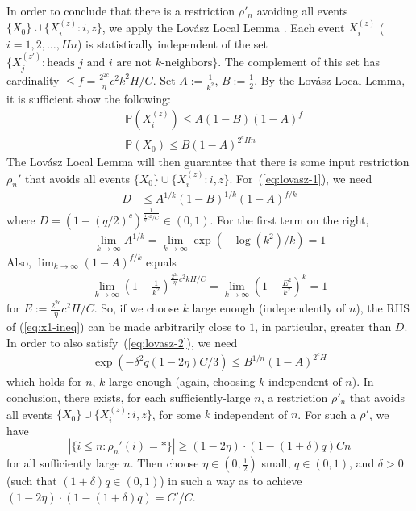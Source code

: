 \documentclass[11pt,a4paper]{article}
\newcommand{\Prob}{\mathbb{P}}%
\begin{document}
In order to conclude that there is a restriction $\rho'_n$ avoiding all events $\{X_0\} \cup \{X_i^{(z)} : i, z\}$, we apply the Lov{\'a}sz Local Lemma \cite[Theorem 6.17]{mitzenmacherprobability}.
Each event $X_i^{(z)}$ ($i=1,2,\dots, Hn$) is statistically independent of the set $\{X_j^{(z')} : \text{heads } j \text{ and } i \text{ are not $k$-neighbors}\}$.
The complement of this set has cardinality $\leq f= \frac{2^{2c}}{\eta}c^2k^2H/C$.
Set $A:=\frac{1}{k^2}$, $B:=\frac{1}{2}$.
By the Lov{\'a}sz Local Lemma, it is sufficient show the following: %
\begin{align}\label{eq:lovasz-1}
&\Prob(X_i^{(z)}) \leq A(1-B)(1-A)^{f} \\ \label{eq:lovasz-2}
&\Prob(X_0)  \leq B (1-A)^{2^cHn}
\end{align}
The Lov{\'a}sz Local Lemma will then guarantee that there is some input restriction $\rho_n'$ that avoids all events $\{X_0\} \cup \{X_i^{(z)} : i, z\}$.
For~(\ref{eq:lovasz-1}), we need
\begin{align}\label{eq:x1-ineq}
    D &\leq A^{1/k}(1-B)^{1/k}(1-A)^{f/k} 
\end{align}
where $D =  \left(1-(q/2)^c\right)^{\frac{1}{\frac{1}{\eta}c^2/C}} \in (0,1)$.
For the first term on the right, 
\begin{align*}
\lim_{k\rightarrow \infty} A^{1/k} = \lim_{k\rightarrow \infty} \exp\left(-\log(k^2) / k\right) = 1
\end{align*}
Also, $\lim_{k\rightarrow \infty} (1-A)^{f/k}$ equals
\begin{align*}
\lim_{k\rightarrow \infty} \left(1-\frac{1}{k^2}\right)^{\frac{2^{2c}}{\eta}c^2kH/C} = \lim_{k\rightarrow \infty} \left(1-\frac{E^2}{k^2}\right)^{k} = 1
\end{align*}
for $E := \frac{2^{2c}}{\eta}c^2H/C$. So, if we choose $k$ large enough (independently of $n$), the RHS of (\ref{eq:x1-ineq}) can be made arbitrarily close to $1$, in particular, greater than $D$.
In order to also satisfy~(\ref{eq:lovasz-2}), we need
\begin{align*}
\exp\left(-\delta^2q(1-2\eta)C/3\right)  \leq B^{1/n} (1-A)^{2^c H}
\end{align*}
which holds for $n$, $k$ large enough (again, choosing $k$ independent of $n$). 
In conclusion, there exists, for each sufficiently-large $n$, a restriction $\rho'_n$ that avoids all events $\{X_0\} \cup \{X_i^{(z)} : i, z\}$, for some $k$ independent of $n$.
For such a $\rho'$, we have
\begin{equation*}
|\{i \leq n: \rho_n'(i) = *\}|\geq (1-2\eta)\cdot (1-(1+\delta)q) C n
\end{equation*}
for all sufficiently large $n$.
Then choose $\eta \in (0,\frac{1}{2})$ small, $q \in (0,1)$, and $\delta >0$ (such that $(1+\delta)q \in (0,1)$) in such a way as to achieve $(1-2\eta)\cdot (1-(1+\delta)q) = C'/C$.
\end{document}
